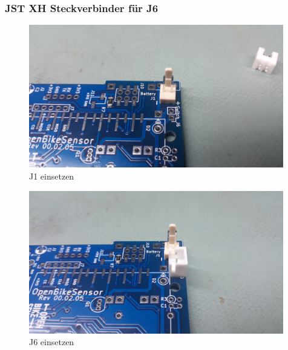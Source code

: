 \documentclass[12pt, a4paper]{article}		%
\begin{document}
\subsubsection{JST XH Steckverbinder für J6}


\begin{minipage}[t]{0.49\textwidth}
\begin{figure}[H]
	\centering
		\includegraphics[width=0.99\textwidth]{Grafiken/20200922_185855.jpg}
	\caption{J1 einsetzen}
	\label{fig:20200922_185855}
\end{figure}
\end{minipage}
\begin{minipage}[t]{0.49\textwidth}
\begin{figure}[H]
	\centering
		\includegraphics[width=0.99\textwidth]{Grafiken/20200922_185934.jpg}
	\caption{J6 einsetzen}
	\label{fig:20200922_185934}
\end{figure}
\end{minipage}
\newline
\end{document}
